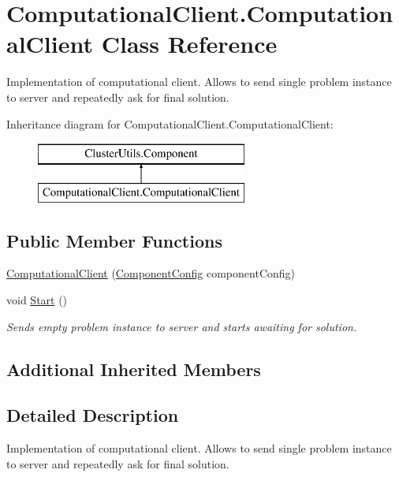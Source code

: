 \hypertarget{class_computational_client_1_1_computational_client}{}\section{Computational\+Client.\+Computational\+Client Class Reference}
\label{class_computational_client_1_1_computational_client}


Implementation of computational client. Allows to send single problem instance to server and repeatedly ask for final solution.  


Inheritance diagram for Computational\+Client.\+Computational\+Client\+:\begin{figure}[H]
\begin{center}
\leavevmode
\includegraphics[height=2.000000cm]{class_computational_client_1_1_computational_client}
\end{center}
\end{figure}
\subsection*{Public Member Functions}
\begin{DoxyCompactItemize}
\item 
\hyperlink{class_computational_client_1_1_computational_client_a82b36bf9a5245a752c3b96b8947c1dc5}{Computational\+Client} (\hyperlink{class_cluster_utils_1_1_component_config}{Component\+Config} component\+Config)
\item 
void \hyperlink{class_computational_client_1_1_computational_client_abd04e67e171f547a6f112bc33c71cb79}{Start} ()
\begin{DoxyCompactList}\small\item\em Sends empty problem instance to server and starts awaiting for solution. \end{DoxyCompactList}\end{DoxyCompactItemize}
\subsection*{Additional Inherited Members}


\subsection{Detailed Description}
Implementation of computational client. Allows to send single problem instance to server and repeatedly ask for final solution. 



